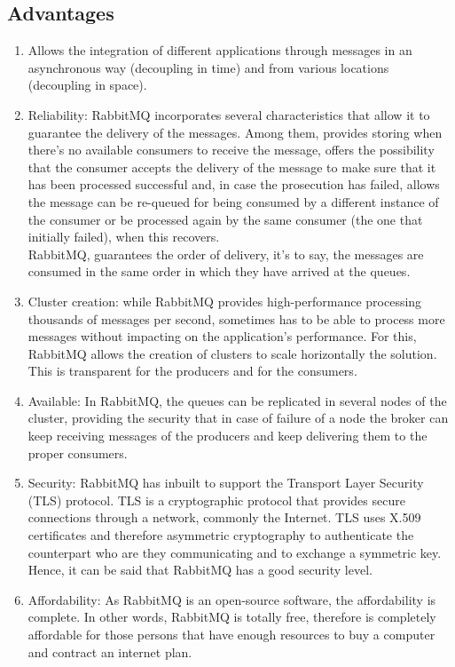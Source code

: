\documentclass[12pt]{article}
\begin{document}
\subsection*{Advantages}
\begin{enumerate}
    \item Allows the integration of different applications through messages in an asynchronous way (decoupling in time) and from various locations (decoupling in space).
    \item Reliability: RabbitMQ incorporates several characteristics that allow it to guarantee the delivery of the messages. Among them, provides storing when there's no available consumers to receive the message, offers the possibility that the consumer accepts the delivery of the message to make sure that it has been processed successful and, in case the prosecution has failed, allows the message can be re-queued for being consumed by a different instance of the consumer or be processed again by the same consumer (the one that initially failed), when this recovers.\\
    RabbitMQ, guarantees the order of delivery, it's to say, the messages are consumed in the same order in which they have arrived at the queues.
    \item Cluster creation: while RabbitMQ provides high-performance processing thousands of messages per second, sometimes has to be able to process more messages without impacting on the application's performance. For this, RabbitMQ allows the creation of clusters to scale horizontally the solution. This is transparent for the producers and for the consumers.
     \item Available: In RabbitMQ, the queues can be replicated in several nodes of the cluster, providing the security that in case of failure of a node the broker can keep receiving messages of the producers and keep delivering them to the proper consumers.
    \item Security: RabbitMQ has inbuilt to support the Transport Layer Security (TLS) protocol. TLS is a cryptographic protocol that provides secure connections through a network, commonly the Internet. TLS uses X.509 certificates and therefore asymmetric cryptography to authenticate the counterpart who are they communicating and to exchange a symmetric key. Hence, it can be said that RabbitMQ has a good security level.
    \item Affordability: As RabbitMQ is an open-source software, the affordability is complete. In other words, RabbitMQ is totally free, therefore is completely affordable for those persons that have enough resources to buy a computer and contract an internet plan.

\end{enumerate}
\end{document}
